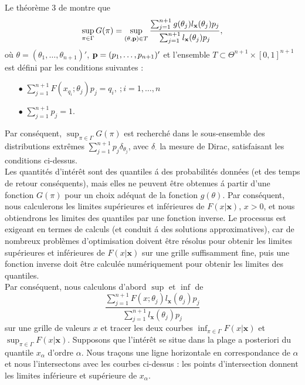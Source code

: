 \documentclass[10pt]{article}
\newcommand{\1}{\mathbbm{1}}
\begin{document}
Le th\'eor\`eme 3 de  \cite{Betro1994} montre que
\[
\sup_{\pi \in \Gamma}G(\pi)=\sup_{(\theta,{\bf p}) \in T} \frac{\sum_{j=1}^{n+1}g(\theta_j)l_\mathbf{x}(\theta_j)p_j}
{\sum_{j=1}^{n+1}l_\mathbf{x}(\theta_j)p_j},
\]
o\`u $\theta=(\theta_1, \ldots ,\theta_{n+1})'$, ${\bf p}=(p_1, \ldots ,p_{n+1})'$ et l'ensemble $T \subset \Theta^{n+1} \times [0,1]^{n+1}$ est d\'efini par les conditions suivantes : \\
\begin{itemize}
  \item[$\bullet$] $\sum_{j=1}^{n+1} F(x_{q_i} ; \theta_j) p_j=q_i, \ ; i=1, \ldots, n$
  \item[$\bullet$] $\sum_{j=1}^{n+1}p_j=1$. \\
\end{itemize}
Par cons\'equent, $\sup_{\pi \in \Gamma}G(\pi)$ est recherch\'e dans le sous-ensemble des distributions extr\^emes $\sum_{j=1}^{n+1}p_j \delta_{\theta_j}$, avec $\delta_{\cdot}$ la mesure  de Dirac, satisfaisant les conditions ci-dessus. \\

Les quantit\'es d'int\'er\^et sont des quantiles \'a des probabilit\'es donn\'ees (et des temps de retour cons\'equents), mais elles ne peuvent \^etre obtenues \'a partir d'une fonction $G(\pi)$ pour un choix ad\'equat de la fonction $g(\theta)$. Par cons\'equent, nous calculerons les limites sup\'erieures et inf\'erieures de $F(x|\mathbf{x})$, $x>0$, et nous obtiendrons les limites des quantiles par une fonction inverse. Le processus est exigeant en termes de calculs (et conduit \'a des solutions approximatives), car de nombreux probl\`emes d'optimisation doivent \^etre r\'esolus pour obtenir les limites sup\'erieures et inf\'erieures de $F(x|\mathbf{x})$ sur une grille suffisamment fine, puis une fonction inverse doit \^etre calcul\'ee num\'eriquement pour obtenir les limites des quantiles. \\

Par cons\'equent, nous calculons d'abord $\sup$ et $\inf$ de
\[
\frac{\sum_{j=1}^{n+1}F(x; \theta_j)l_\mathbf{x}(\theta_j)p_j}
{\sum_{j=1}^{n+1}l_\mathbf{x}(\theta_j)p_j}
\]
sur une grille de valeurs $x$ et tracer les deux courbes $\inf_{\pi \in \Gamma} F(x|\mathbf{x})$ et $\sup_{\pi \in \Gamma} F(x|\mathbf{x})$. Supposons que l'int\'er\^et se situe dans la plage a posteriori du quantile $x_{\alpha}$ d'ordre $\alpha$. Nous traçons une ligne horizontale en correspondance de $\alpha$ et nous l'intersectons avec les courbes ci-dessus : les points d'intersection donnent les limites inf\'erieure et sup\'erieure de $x_{\alpha}$.
\end{document}
